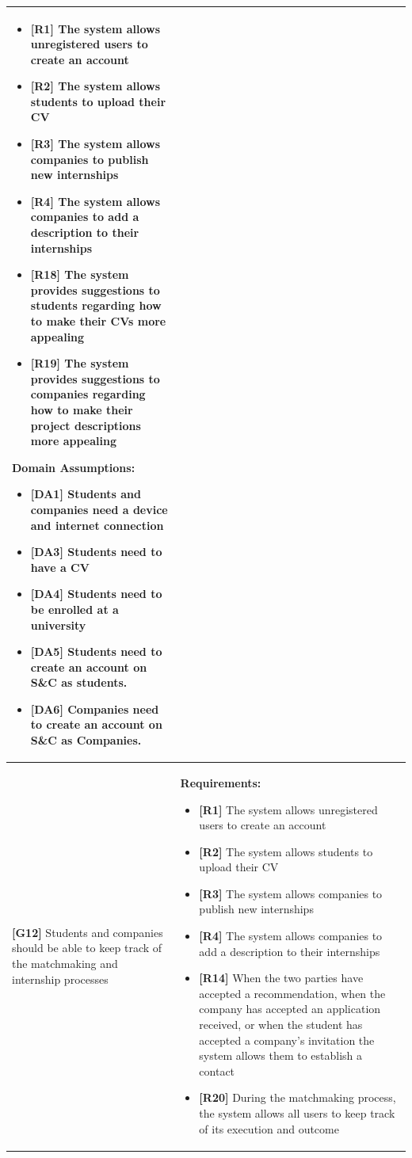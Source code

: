 \begin{longtable}{|p{}|p{}|}
\begin{itemize}
    \item \textbf{[R1]} The system allows unregistered users to create an account
    \item \textbf{[R2]} The system allows students to upload their CV
    \item \textbf{[R3]} The system allows companies to publish new internships
    \item \textbf{[R4]} The system allows companies to add a description to their internships
    \item \textbf{[R18]} The system provides suggestions to students regarding how to make their CVs more appealing
    \item \textbf{[R19]} The system provides suggestions to companies regarding how to make their project descriptions more appealing
\end{itemize}
\textbf{Domain Assumptions:}
\begin{itemize}
    \item \textbf{[DA1]} Students and companies need a device and internet connection
     \item \textbf{[DA3]} Students need to have a CV
     \item \textbf{[DA4]} Students need to be enrolled at a university
    \item \textbf{[DA5]} Students need to create an account on S\&C as students.
    \item \textbf{[DA6]} Companies need to create an account on S\&C as Companies.
\end{itemize} \\
\hline
\textbf{[G12]} Students and companies should be able to keep track of the matchmaking and internship processes
& 
\textbf{Requirements:}
\begin{itemize}
    \item \textbf{[R1]} The system allows unregistered users to create an account
    \item \textbf{[R2]} The system allows students to upload their CV
    \item \textbf{[R3]} The system allows companies to publish new internships
    \item \textbf{[R4]} The system allows companies to add a description to their internships
    \item \textbf{[R14]} When the two parties have accepted a recommendation, when the company has accepted an application received, or when the student has accepted a company's invitation the system allows them to establish a contact
    \item \textbf{[R20]} During the matchmaking process, the system allows all users to keep track of its execution and outcome

\end{itemize}
\end{longtable}
